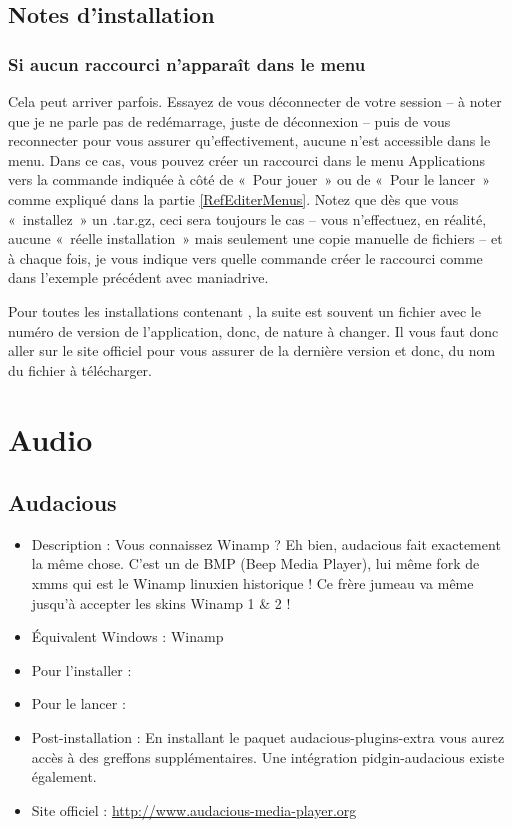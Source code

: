 \subsection{Notes d'installation}
\subsubsection{Si aucun raccourci n'apparaît dans le menu}
Cela peut arriver parfois. Essayez de vous déconnecter de votre session -- à noter que je ne parle pas de redémarrage, juste de déconnexion -- puis de vous reconnecter pour vous assurer qu'effectivement, aucune  n'est accessible dans le menu. Dans ce cas, vous pouvez créer un raccourci dans le menu Applications vers la commande indiquée à côté de «~Pour jouer~» ou de «~Pour le lancer~» comme expliqué dans la partie \ref{RefEditerMenus}. Notez que dès que vous «~installez~» un .tar.gz, ceci sera toujours le cas -- vous n'effectuez, en réalité, aucune «~réelle installation~» mais seulement une copie manuelle de fichiers -- et à chaque fois, je vous indique vers quelle commande créer le raccourci comme dans l'exemple précédent avec maniadrive.
\begin{attention}
Pour toutes les installations contenant , la suite est souvent un fichier avec le numéro de version de l'application, donc, de nature à changer. Il vous faut donc aller sur le site officiel pour vous assurer de la dernière version et donc, du nom du fichier à télécharger.
\end{attention}
\section{Audio}
\subsection{Audacious}
\label{RefInstallAudacious}
\begin{itemize}
\begingroup
{}
\item Description : Vous connaissez Winamp ? Eh bien, audacious fait exactement la même chose. C'est un  de BMP (Beep Media Player), lui même fork de xmms qui est le Winamp linuxien historique ! Ce frère jumeau va même jusqu'à accepter les skins Winamp 1 \& 2 !{\par}
\item Équivalent Windows : Winamp{\par}
\item Pour l'installer : 
\item Pour le lancer : 
\item Post-installation :  En installant le paquet audacious-plugins-extra vous aurez accès à des greffons supplémentaires. Une intégration pidgin-audacious existe également.{\par}
\endgroup
\item Site officiel : \url{http://www.audacious-media-player.org}{\par}
\end{itemize}

